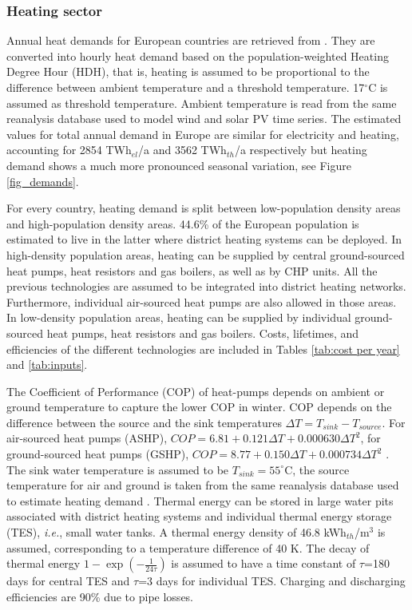 \documentclass[3p]{elsarticle} %
\begin{document}
\FloatBarrier
\subsubsection{Heating sector}

Annual heat demands for European countries are retrieved from \cite{HRE}. They are converted into hourly heat demand based on the population-weighted \cite{NUTS3} Heating Degree Hour (HDH), that is, heating is assumed to be proportional to the difference between ambient temperature and a threshold temperature. 17$^{\circ}$C is assumed as threshold temperature. Ambient temperature is read from the same reanalysis database \cite{CFSR} used to model wind and solar PV time series. The estimated values for total annual demand in Europe are similar for electricity and heating, accounting for 2854 TWh$_{el}$/a and 3562 TWh$_{th}$/a respectively but heating demand shows a much more pronounced seasonal variation, see Figure \ref{fig_demands}.

For every country, heating demand is split between low-population density areas and high-population density areas. 44.6\%  of the European population is estimated to live in the latter \cite{Brown_2018} where district heating systems can be deployed. In high-density population areas, heating can be supplied by central ground-sourced heat pumps, heat resistors and gas boilers, as well as by CHP units. All the previous technologies are assumed to be integrated into district heating networks. Furthermore, individual air-sourced heat pumps are also allowed in those areas. In low-density population areas, heating can be supplied by individual ground-sourced heat pumps, heat resistors and gas boilers. Costs, lifetimes, and efficiencies of the different technologies are included in Tables \ref{tab:cost per year} and \ref{tab:inputs}. \

The Coefficient of Performance (COP) of heat-pumps depends on ambient or ground temperature to capture the lower COP in winter. COP depends on the difference between the source and the sink temperatures $\Delta T = T_{sink}-T_{source}$. For air-sourced heat pumps (ASHP), $COP= 6.81 + 0.121 \Delta T +  0.000630 \Delta T^2$, for ground-sourced heat pumps (GSHP), $COP=8.77 + 0.150 \Delta T + 0.000734 \Delta T^2$ \cite{Staffell_2012}. The sink water temperature is assumed to be $T_{sink}=55^{\circ}$C, the source temperature for air and ground is taken from the same reanalysis database used to estimate heating demand \cite{CFSR}. Thermal energy can be stored in large water pits associated with district heating systems and individual thermal energy storage (TES), \textit{i.e.}, small water tanks.  A thermal energy density of 46.8 kWh$_{th}$/m$^3$ is assumed, corresponding to a temperature difference of 40 K. The decay of thermal energy $1 - \exp(- \frac{1}{24 \tau})$ is assumed to have a time constant of $\tau$=180 days for central TES and $\tau$=3 days for individual TES. Charging and discharging efficiencies are 90\% due to pipe losses.\
\end{document}
